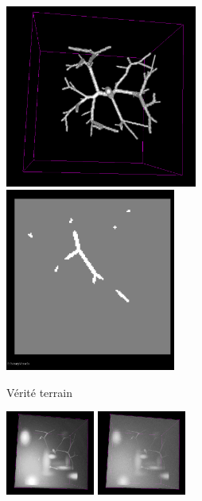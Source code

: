 \begin{figure}
\captionsetup[subfigure]{justification=centering}

\begin{subfigure}{\textwidth}
  \centering
  \includegraphics[height=6cm]{Images/gen_vascu_V2_GT.png}
  \includegraphics[height=6cm]{Images/gen_vascu_V2_GT_2D.png}
  \caption{Vérité terrain}
\end{subfigure}
\begin{subfigure}{\textwidth}
  \includegraphics[width=0.32\textwidth]{Images/gen_vascu_V2_r2.png}
  \includegraphics[width=0.32\textwidth]{Images/gen_vascu_V2_r4.png}

\end{subfigure}
\end{figure}
